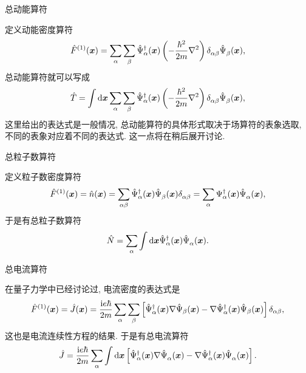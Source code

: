 \begin{example}总动能算符

定义动能密度算符
\begin{equation}
   \hat F^{(1)}(\boldsymbol{x})=\sum_\alpha\sum_\beta\hat\Psi^\dagger_{\alpha}(\boldsymbol{x})\left( -\frac{\hbar^2}{2m}\nabla^2 \right)\delta^{}_{\alpha\beta}\hat \Psi^{}_\beta(\boldsymbol{x}), 
\end{equation}
总动能算符就可以写成
\begin{equation}
   \hat T=\int\mathrm d \boldsymbol{x}\sum_\alpha\sum_\beta\hat\Psi_\alpha^\dagger(\boldsymbol{x})\left( -\frac{\hbar^2}{2m}\nabla^2 \right)\delta^{}_{\alpha\beta}\hat\Psi^{}_\beta(\boldsymbol{x}), 
\end{equation}
这里给出的表达式是一般情况, 总动能算符的具体形式取决于场算符的表象选取, 不同的表象对应着不同的表达式. 这一点将在稍后展开讨论. 
\end{example}

\begin{example}总粒子数算符

定义粒子数密度算符
\begin{equation}
   \hat F^{(1)}(\boldsymbol{x})=\hat n(\boldsymbol{x})=\sum_{\alpha\beta}\hat\Psi_{\alpha}^\dagger(\boldsymbol{x})\hat\Psi^{}_\beta(\boldsymbol{x})\delta^{}_{\alpha\beta}=\sum_\alpha\Psi_\alpha^\dagger(\boldsymbol{x})\hat\Psi^{}_\alpha(\boldsymbol{x}), 
\end{equation}
于是有总粒子数算符
\begin{equation}
   \hat N=\sum_\alpha\int\mathrm d\boldsymbol{x}\hat\Psi_\alpha^\dagger(\boldsymbol{x})\hat\Psi^{}_\alpha(\boldsymbol{x}). 
\end{equation}
\end{example}

\begin{example}总电流算符

在量子力学中已经讨论过, 电流密度的表达式是
\begin{equation}
   \hat F^{(1)}(\boldsymbol{x})=\hat J(\boldsymbol{x})=\frac{\mathrm ie\hbar}{2m}\sum_\alpha\sum_\beta\left[ \hat\Psi^\dagger_\alpha(\boldsymbol{x})\nabla\hat\Psi_\beta(\boldsymbol{x})-\nabla\hat\Psi_\alpha^\dagger(\boldsymbol{x})\hat\Psi_\beta(\boldsymbol{x}) \right]\delta_{\alpha\beta}, 
\end{equation}
这也是电流连续性方程的结果. 于是有总电流算符
\begin{equation}
   \hat J=\frac{\mathrm ie\hbar}{2m}\sum_\alpha\int\mathrm d\boldsymbol{x}\left[ \hat\Psi_\alpha^\dagger(\boldsymbol{x})\nabla\hat\Psi^{}_\alpha(\boldsymbol{x})-\nabla\hat\Psi_\alpha^\dagger(\boldsymbol{x})\hat\Psi^{}_\alpha(\boldsymbol{x}) \right]. 
\end{equation}
\end{example}

